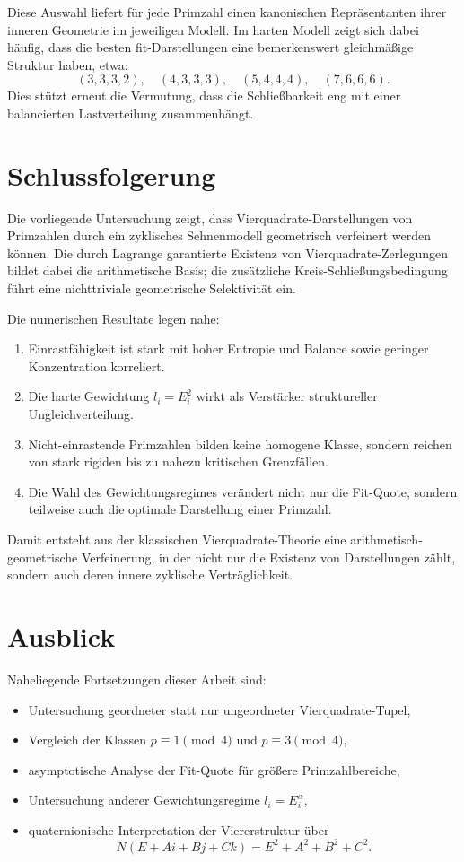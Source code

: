 \documentclass[11pt,a4paper]{article}
\theoremstyle{remark}
\begin{document}
	Diese Auswahl liefert für jede Primzahl einen kanonischen Repräsentanten ihrer inneren Geometrie im jeweiligen Modell. 
	Im harten Modell zeigt sich dabei häufig, dass die besten fit-Darstellungen eine bemerkenswert gleichmäßige Struktur haben, etwa:
	\[
	(3,3,3,2),\quad
	(4,3,3,3),\quad
	(5,4,4,4),\quad
	(7,6,6,6).
	\]
	Dies stützt erneut die Vermutung, dass die Schließbarkeit eng mit einer balancierten Lastverteilung zusammenhängt.
	
	\section{Schlussfolgerung}
	
	Die vorliegende Untersuchung zeigt, dass Vierquadrate-Darstellungen von Primzahlen durch ein zyklisches Sehnenmodell geometrisch verfeinert werden können. 
	Die durch Lagrange garantierte Existenz von Vierquadrate-Zerlegungen bildet dabei die arithmetische Basis; die zusätzliche Kreis-Schließungsbedingung führt eine nichttriviale geometrische Selektivität ein.
	
	Die numerischen Resultate legen nahe:
	
	\begin{enumerate}[label=\arabic*)]
		\item Einrastfähigkeit ist stark mit hoher Entropie und Balance sowie geringer Konzentration korreliert.
		\item Die harte Gewichtung \(l_i=E_i^2\) wirkt als Verstärker struktureller Ungleichverteilung.
		\item Nicht-einrastende Primzahlen bilden keine homogene Klasse, sondern reichen von stark rigiden bis zu nahezu kritischen Grenzfällen.
		\item Die Wahl des Gewichtungsregimes verändert nicht nur die Fit-Quote, sondern teilweise auch die optimale Darstellung einer Primzahl.
	\end{enumerate}
	
	Damit entsteht aus der klassischen Vierquadrate-Theorie eine arithmetisch-geometrische Verfeinerung, in der nicht nur die Existenz von Darstellungen zählt, sondern auch deren innere zyklische Verträglichkeit.
	
	\section*{Ausblick}
	
	Naheliegende Fortsetzungen dieser Arbeit sind:
	
	\begin{itemize}
		\item Untersuchung geordneter statt nur ungeordneter Vierquadrate-Tupel,
		\item Vergleich der Klassen \(p\equiv 1 \pmod 4\) und \(p\equiv 3 \pmod 4\),
		\item asymptotische Analyse der Fit-Quote für größere Primzahlbereiche,
		\item Untersuchung anderer Gewichtungsregime \(l_i=E_i^\alpha\),
		\item quaternionische Interpretation der Viererstruktur über
		\[
		N(E+Ai+Bj+Ck)=E^2+A^2+B^2+C^2.
		\]
	\end{itemize}
	
\end{document}
